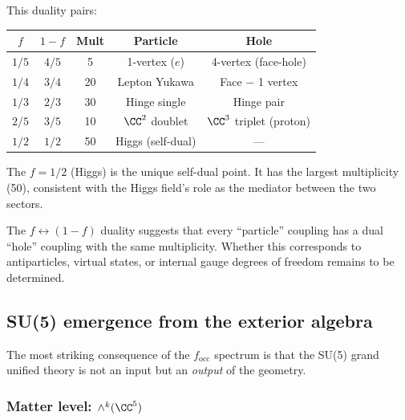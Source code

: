 This duality pairs:
\begin{center}
\begin{tabular}{ccccc}
\hline
$f$ & $1-f$ & Mult & Particle & Hole \\
\hline
$1/5$ & $4/5$ & 5 & 1-vertex ($e$) & 4-vertex (face-hole) \\
$1/4$ & $3/4$ & 20 & Lepton Yukawa & Face $-$ 1 vertex \\
$1/3$ & $2/3$ & 30 & Hinge single & Hinge pair \\
$2/5$ & $3/5$ & 10 & $\CC^2$ doublet & $\CC^3$ triplet (proton) \\
$1/2$ & $1/2$ & 50 & Higgs (self-dual) & --- \\
\hline
\end{tabular}
\end{center}

The $f = 1/2$ (Higgs) is the unique self-dual point.  It has the largest multiplicity (50), consistent with the Higgs field's role as the mediator between the two sectors.

\begin{remark}
The $f \leftrightarrow (1-f)$ duality suggests that every ``particle'' coupling has a dual ``hole'' coupling with the same multiplicity.  Whether this corresponds to antiparticles, virtual states, or internal gauge degrees of freedom remains to be determined.
\end{remark}

\subsection{SU(5) emergence from the exterior algebra}
\label{sec:su5_emergence}

The most striking consequence of the $f_\mathrm{occ}$ spectrum is that the SU(5) grand unified theory is not an input but an \emph{output} of the geometry.

\subsubsection{Matter level: $\wedge^k(\CC^5)$}

